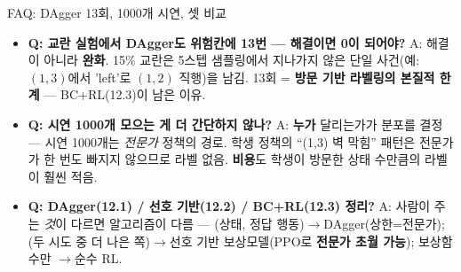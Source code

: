 \begin{frame}{FAQ: DAgger 13회, 1000개 시연, 셋 비교}
  \small
  \begin{itemize}
    \item \textbf{Q: 교란 실험에서 DAgger도 위험칸에 13번 — 해결이면
      0이 되어야?} A: 해결이 아니라 \textbf{완화}. 15\% 교란은
      5스텝 샘플링에서 지나가지 않은 단일 사건(예: $(1,3)$에서
      'left'로 $(1,2)$ 직행)을 남김. 13회 = \textbf{방문 기반
      라벨링의 본질적 한계} — BC+RL(12.3)이 남은 이유.
    \item \textbf{Q: 시연 1000개 모으는 게 더 간단하지 않나?}
      A: \textbf{누가} 달리는가가 분포를 결정 — 시연 1000개는
      \textit{전문가} 정책의 경로. 학생 정책의 ``(1,3) 벽 막힘''
      패턴은 전문가가 한 번도 빠지지 않으므로 라벨 없음.
      \textbf{비용}도 학생이 방문한 상태 수만큼의 라벨이 훨씬 적음.
    \item \textbf{Q: DAgger(12.1) / 선호 기반(12.2) / BC+RL(12.3)
      정리?} A: 사람이 주는 \textit{것}이 다르면 알고리즘이 다름 —
      (상태, 정답 행동)$\to$DAgger(상한=전문가); (두 시도 중 더
      나은 쪽)$\to$선호 기반 보상모델(PPO로 \textbf{전문가 초월
      가능}); 보상함수만 $\to$순수 RL.
  \end{itemize}
\end{frame}
